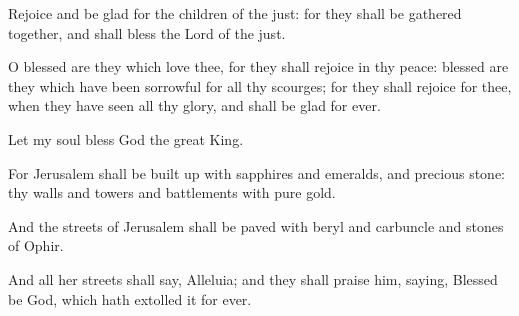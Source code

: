 {\par }{\PP {}Rejoice and be glad for the children of the just: for they shall be gathered together, and shall bless the Lord of the just.
\par }{\PP {}O blessed are they which love thee, for they shall rejoice in thy peace: blessed are they which have been sorrowful for all thy scourges; for they shall rejoice for thee, when they have seen all thy glory, and shall be glad for ever.
\par }{\PP {}Let my soul bless God the great King.
\par }{\PP {}For Jerusalem shall be built up with sapphires and emeralds, and precious stone: thy walls and towers and battlements with pure gold.
\par }{\PP {}And the streets of Jerusalem shall be paved with beryl and carbuncle and stones of Ophir.
\par }{\PP {}And all her streets shall say, Alleluia; and they shall praise him, saying, Blessed be God, which hath extolled it for ever.

}
